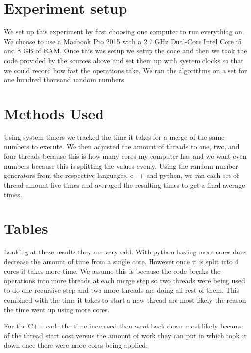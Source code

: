 \documentclass{article}
\begin{document}
\section{Experiment setup}

We set up this experiment by first choosing one computer to run everything on. We choose to use a Macbook Pro 2015 with a 2.7 GHz Dual-Core Intel Core i5 and 8 GB of RAM. Once this was setup we setup the code and then we took the code provided by the sources above and set them up with system clocks so that we could record how fast the operations take. We ran the algorithms on a set for one hundred thousand random numbers.

\section{Methods Used}

Using system timers we tracked the time it takes for a merge of the same numbers to execute. We then adjusted the amount of threads to one, two, and four threads because this is how many cores my computer has and we want even numbers because this is splitting the values evenly. Using the random number generators from the respective languages, c++ and python, we ran each set of thread amount five times and averaged the resulting times to get a final average times. 

\section{Tables}


Looking at these results they are very odd. With python having more cores does decrease the amount of time from a single core. However once it is split into 4 cores it takes more time. We assume this is because the code breaks the operations into more threads at each merge step so two threads were being used to do one recursive step and two more threads are doing all rest of them. This combined with the time it takes to start a new thread are most likely the reason the time went up using more cores. \newline

For the C++ code the time increased then went back down most likely because of the thread start cost versus the amount of work they can put in which took it down once there were more cores being applied. 
\end{document}
